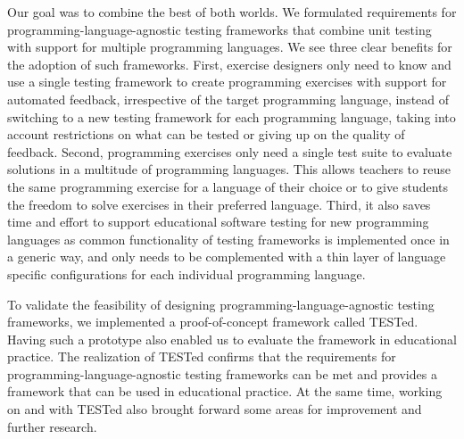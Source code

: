 \documentclass[../main]{subfiles}
\begin{document}
Our goal was to combine the best of both worlds.
We formulated requirements for programming-language-agnostic testing frameworks that combine unit testing with support for multiple programming languages.
We see three clear benefits for the adoption of such frameworks.
First, exercise designers only need to know and use a single testing framework to create programming exercises with support for automated feedback, irrespective of the target programming language, instead of switching to a new testing framework for each programming language, taking into account restrictions on what can be tested or giving up on the quality of feedback.
Second, programming exercises only need a single test suite to evaluate solutions in a multitude of programming languages.
This allows teachers to reuse the same programming exercise for a language of their choice or to give students the freedom to solve exercises in their preferred language.
Third, it also saves time and effort to support educational software testing for new programming languages as common functionality of testing frameworks is implemented once in a generic way, and only needs to be complemented with a thin layer of language specific configurations for each individual programming language.

To validate the feasibility of designing programming-language-agnostic testing frameworks, we implemented a proof-of-concept framework called TESTed.
Having such a prototype also enabled us to evaluate the framework in educational practice.
The realization of TESTed confirms that the requirements for programming-language-agnostic testing frameworks can be met and provides a framework that can be used in educational practice.
At the same time, working on and with TESTed also brought forward some areas for improvement and further research.
\end{document}
